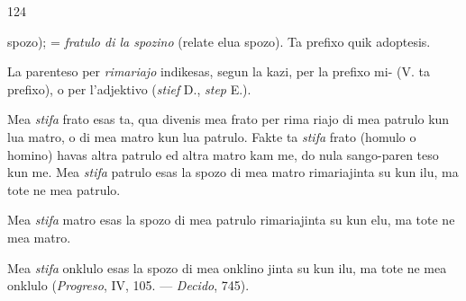 \begin{VUpage}[128]{124}

\VUcontinue
spozo);  = \textit{fratulo di la spozino} (relate elua spozo).\nl
Ta prefixo quik adoptesis.

La parenteso per \textit{rimariajo} indikesas, segun la kazi, per\nl
la prefixo mi- (V. ta prefixo), o per l'adjektivo \nl
(\textit{stief} D., \textit{step} E.).

Mea \textit{stifa} frato esas ta, qua divenis mea frato per rima\cc
riajo di mea patrulo kun lua matro, o di mea matro kun\nl
lua patrulo. Fakte ta \textit{stifa} frato (homulo o homino) havas\nl
altra patrulo ed altra matro kam me, do nula sango-paren\cc
teso kun me. Mea \textit{stifa} patrulo esas la spozo di mea matro\nl
rimariajinta su kun ilu, ma tote ne mea patrulo.

Mea \textit{stifa} matro esas la spozo di mea patrulo rimariajinta\nl
su kun elu, ma tote ne mea matro.

Mea \textit{stifa} onklulo esas la spozo di mea onklino \cc
jinta su kun ilu, ma tote ne mea onklulo (\textit{Progreso}, IV, 105.\nl
--- \textit{Decido}, 745).


\end{VUpage}
